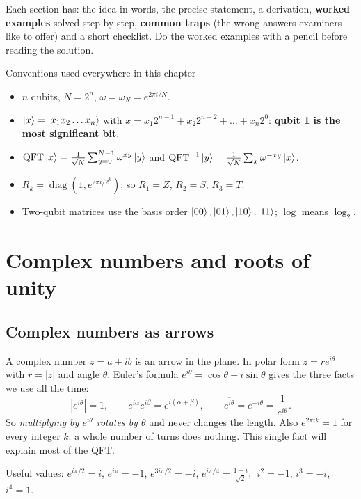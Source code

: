 \documentclass[11pt,a4paper,openany]{book}
\newcommand{\QFT}{\mathrm{QFT}}
\begin{document}
Each section has: the idea in words, the precise statement, a derivation, \textbf{worked examples} solved step by step,
\textbf{common traps} (the wrong answers examiners like to offer) and a short checklist. Do the worked examples with a
pencil before reading the solution.

\begin{defn}{Conventions used everywhere in this chapter}
\begin{itemize}[leftmargin=1.2em, itemsep=1pt]
\item $n$ qubits, $N = 2^n$, $\omega = \omega_N = e^{2\pi i/N}$.
\item $\ket{x} = \ket{x_1x_2\dots x_n}$ with $x = x_1 2^{n-1} + x_2 2^{n-2} + \dots + x_n 2^0$: \textbf{qubit 1 is the most significant bit}.
\item $\QFT\ket{x} = \frac{1}{\sqrt N}\sum_{y=0}^{N-1}\omega^{xy}\ket{y}$ and $\QFT^{-1}\ket{y} = \frac{1}{\sqrt N}\sum_{x}\omega^{-xy}\ket{x}$.
\item $R_k = \operatorname{diag}(1, e^{2\pi i/2^k})$; so $R_1 = Z$, $R_2 = S$, $R_3 = T$.
\item Two-qubit matrices use the basis order $\ket{00},\ket{01},\ket{10},\ket{11}$; $\log$ means $\log_2$.
\end{itemize}
\end{defn}

\section{Complex numbers and roots of unity}
\subsection{Complex numbers as arrows}
A complex number $z = a + ib$ is an arrow in the plane. In polar form $z = r e^{i\theta}$ with $r = |z|$ and angle
$\theta$. Euler's formula $e^{i\theta} = \cos\theta + i\sin\theta$ gives the three facts we use all the time:
\[ |e^{i\theta}| = 1, \qquad e^{i\alpha}e^{i\beta} = e^{i(\alpha+\beta)}, \qquad \overline{e^{i\theta}} = e^{-i\theta} = \frac{1}{e^{i\theta}}. \]
So \emph{multiplying by $e^{i\theta}$ rotates by $\theta$} and never changes the length. Also $e^{2\pi i k} = 1$ for every
integer $k$: a whole number of turns does nothing. This single fact will explain most of the QFT.

Useful values: $e^{i\pi/2} = i$, $e^{i\pi} = -1$, $e^{3i\pi/2} = -i$, $e^{i\pi/4} = \frac{1+i}{\sqrt2}$, $\;i^2 = -1$, $i^3 = -i$, $i^4 = 1$.
\end{document}
